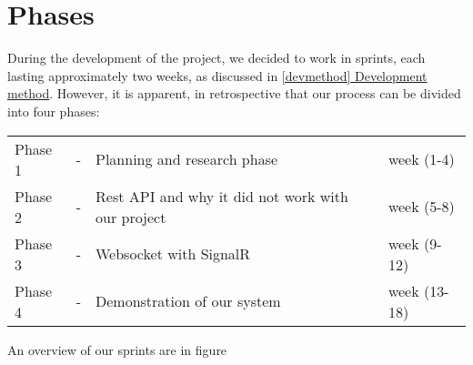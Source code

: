 \chapter{Phases}
During the development of the project, we decided to work in sprints, each lasting approximately two weeks, as discussed in \hyperref[devmethod]{\ref{devmethod} Development method}. However, it is apparent, in retrospective that our process can be divided into four phases:

\begin{center}
	\begin{tabular}{lcll}
		Phase 1 & - & Planning and research phase & week (1-4) \\
		Phase 2& - & Rest API and why it did not work with our project& week (5-8) \\
		Phase 3 & - & Websocket with SignalR & week (9-12) \\
		Phase 4 & - & Demonstration of our system & week (13-18) 
	\end{tabular}
\end{center}

An overview of our sprints are in figure 

%
%
%







